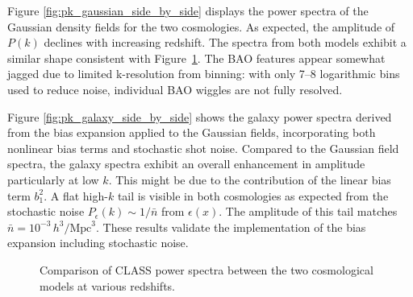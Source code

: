 \documentclass[trackchanges]{aastex7}
\begin{document}
Figure \ref{fig:pk_gaussian_side_by_side} displays the power spectra of the Gaussian density fields for the two cosmologies.
As expected, the amplitude of $P(k)$ declines with increasing redshift. 
The spectra from both models exhibit a similar shape consistent with Figure~\ref{fig:pk_class_side_by_side}. 
The BAO features appear somewhat jagged due to limited k-resolution from binning: with only 7–8 logarithmic bins used to reduce noise, individual BAO wiggles are not fully resolved.

Figure \ref{fig:pk_galaxy_side_by_side} shows the galaxy power spectra derived from the bias expansion applied to the Gaussian fields, incorporating both nonlinear bias terms and stochastic shot noise.
Compared to the Gaussian field spectra, the galaxy spectra exhibit an overall enhancement in amplitude particularly at low $k$.
This might be due to the contribution of the linear bias term $b_1^2$. 
A flat high-$k$ tail is visible in both cosmologies as expected from the stochastic noise $P_\epsilon(k) \sim 1/\bar{n}$ from $\epsilon(x)$. 
The amplitude of this tail matches $\bar{n} = 10^{-3} \, h^3/\mathrm{Mpc}^3$. 
These results validate the implementation of the bias expansion including stochastic noise.
\begin{figure}[ht]
    \centering
    \hfill
    \caption{Comparison of CLASS power spectra between the two cosmological models at various redshifts.}
    \label{fig:pk_class_side_by_side}
\end{figure}
\end{document}
